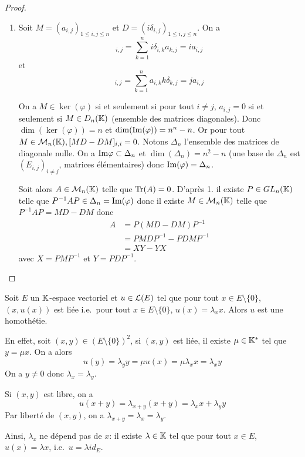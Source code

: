 \documentclass[12pt]{article}
\begin{document}
\begin{proof}
\begin{enumerate}
        \item Soit $M=(a_{i,j})_{1\leqslant i,j\leqslant n}$ et $D=(i\delta_{i,j})_{1\leqslant i,j\leqslant n}$. On a 
        \begin{equation}
            [DM]_{i,j}=\sum_{k=1}^{n}i\delta_{i,k}a_{k,j}=ia_{i,j}
        \end{equation}
        et 
        \begin{equation}
            [MD]_{i,j}=\sum_{k=1}^{n}a_{i,k}k\delta_{k,j}=ja_{i,j}
        \end{equation}

        On a $M\in\ker(\varphi)$ si et seulement si pour tout $i\neq j$, $a_{i,j}=0$ si et seulement si $M\in D_{n}(\mathbb{K})$ (ensemble des matrices diagonales). Donc $\dim(\ker(\varphi))=n$ et $\dim(\mathrm{Im}(\varphi))=n^{n}-n$. Or pour tout $M\in \mathcal{M}_{n}(\mathbb{K}), [MD-DM]_{i,i}=0$. Notons $\Delta_{n}$ l'ensemble des matrices de diagonale nulle. On a $\mathrm{Im}\varphi\subset\Delta_{n}$ et $\dim(\Delta_{n})=n^{2}-n$ (une base de $\Delta_{n}$ est $(E_{i,j})_{i\neq j}$, matrices élémentaires) donc $\mathrm{Im}(\varphi)=\Delta_{n}$.

        Soit alors $A\in\mathcal{M}_{n}(\mathbb{K})$ telle que $\operatorname{Tr}(A)=0$. D'après 1. il existe $P\in GL_{n}(\mathbb{K})$ telle que $P^{-1}AP\in\Delta_{n}=\mathrm{Im}(\varphi)$ donc il existe $M\in\mathcal{M}_{n}(\mathbb{K})$ telle que $P^{-1}AP=MD-DM$ donc 
        \begin{align}
            A
            &=P(MD-DM)P^{-1}\\
            &=PM DP^{-1}-PD MP^{-1}\\
            &=\boxed{XY-YX}
        \end{align}
        avec $X=PMP^{-1}$ et $Y=PDP^{-1}$.
    \end{enumerate}
\end{proof}

\begin{remark}
    Soit $E$ un $\mathbb{K}$-espace vectoriel et $u\in\mathcal{L}(E)$ tel que pour tout $x\in E\setminus\lbrace0\rbrace$, $(x,u(x))$ est liée i.e.~pour tout $x\in E\setminus\lbrace0\rbrace$, $u(x)=\lambda_{x}x$. Alors $u$ est une homothétie.

    En effet, soit $(x,y)\in\left(E\setminus\lbrace0\rbrace\right)^{2}$, si $(x,y)$ est liée, il existe $\mu\in\mathbb{K}^{*}$ tel que $y=\mu x$. On a alors 
    \begin{equation}
        u(y)=\lambda_{y}y=\mu u(x)=\mu\lambda_{x}x=\lambda_{x}y
    \end{equation}
    On a $y\neq0$ donc $\lambda_{x}=\lambda_{y}$.

    Si $(x,y)$ est libre, on a
    \begin{equation}
        u(x+y)=\lambda_{x+y}(x+y)=\lambda_{x}x+\lambda_{y}y
    \end{equation}
    Par liberté de $(x,y)$, on a $\lambda_{x+y}=\lambda_{x}=\lambda_{y}$. 
    
    Ainsi, $\lambda_{x}$ ne dépend pas de $x$: il existe $\lambda\in\mathbb{K}$ tel que pour tout $x\in E$, $u(x)=\lambda x$, i.e.~$u=\lambda id_{E}$.
\end{remark}
\end{document}

